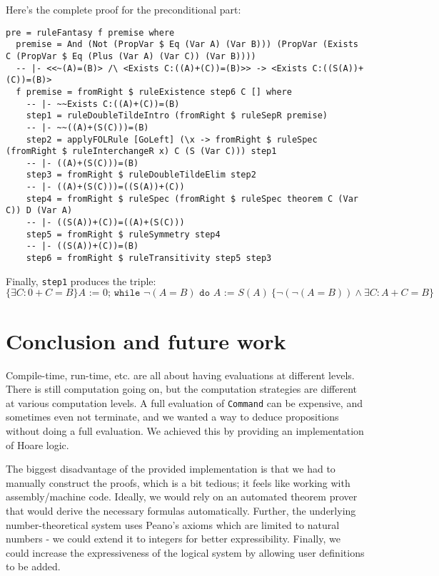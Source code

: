 \documentclass{article}
\begin{document}
Here's the complete proof for the preconditional part:

\begin{lstlisting}
pre = ruleFantasy f premise where
  premise = And (Not (PropVar $ Eq (Var A) (Var B))) (PropVar (Exists C (PropVar $ Eq (Plus (Var A) (Var C)) (Var B))))
  -- |- <<~(A)=(B)> /\ <Exists C:((A)+(C))=(B)>> -> <Exists C:((S(A))+(C))=(B)>
  f premise = fromRight $ ruleExistence step6 C [] where
    -- |- ~~Exists C:((A)+(C))=(B)
    step1 = ruleDoubleTildeIntro (fromRight $ ruleSepR premise)
    -- |- ~~((A)+(S(C)))=(B)
    step2 = applyFOLRule [GoLeft] (\x -> fromRight $ ruleSpec (fromRight $ ruleInterchangeR x) C (S (Var C))) step1
    -- |- ((A)+(S(C)))=(B)
    step3 = fromRight $ ruleDoubleTildeElim step2
    -- |- ((A)+(S(C)))=((S(A))+(C))
    step4 = fromRight $ ruleSpec (fromRight $ ruleSpec theorem C (Var C)) D (Var A)
    -- |- ((S(A))+(C))=((A)+(S(C)))
    step5 = fromRight $ ruleSymmetry step4
    -- |- ((S(A))+(C))=(B)
    step6 = fromRight $ ruleTransitivity step5 step3
\end{lstlisting}

Finally, \texttt{step1} produces the triple:
$$\{\exists C: 0+C=B\} A \texttt{ := } 0 \texttt{; while } \neg(A = B) \texttt{ do }A\texttt{ := }S(A) \ \{\neg (\neg (A = B)) \land \exists C: A + C = B\}$$

\section{Conclusion and future work}

Compile-time, run-time, etc. are all about having evaluations at different levels. There is still computation going on, but the computation strategies are different at various computation levels. A full evaluation of \texttt{Command} can be expensive, and sometimes even not terminate, and we wanted a way to deduce propositions without doing a full evaluation. We achieved this by providing an implementation of Hoare logic.

The biggest disadvantage of the provided implementation is that we had to manually construct the proofs, which is a bit tedious; it feels like working with assembly/machine code. Ideally, we would rely on an automated theorem prover that would derive the necessary formulas automatically. Further, the underlying number-theoretical system uses Peano's axioms which are limited to natural numbers - we could extend it to integers for better expressibility. Finally, we could increase the expressiveness of the logical system by allowing user definitions to be added.
\end{document}

